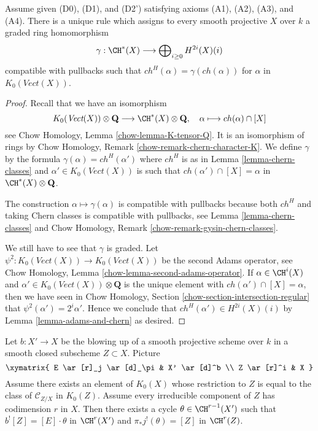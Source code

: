 \begin{lemma}
\label{lemma-cycle-classes}
Assume given (D0), (D1), and (D2') satisfying axioms (A1), (A2), (A3), and (A4).
There is a unique rule which assigns to every smooth projective $X$ over $k$
a graded ring homomorphism
$$
\gamma : \CH^*(X) \longrightarrow \bigoplus\nolimits_{i \geq 0} H^{2i}(X)(i)
$$
compatible with pullbacks such that $ch^H(\alpha) = \gamma(ch(\alpha))$
for $\alpha$ in $K_0(\textit{Vect}(X))$.
\end{lemma}

\begin{proof}
Recall that we have an isomorphism
$$
K_0(\textit{Vect}(X)) \otimes \mathbf{Q}
\longrightarrow \CH^*(X) \otimes \mathbf{Q},\quad
\alpha \longmapsto ch(\alpha) \cap [X]
$$
see Chow Homology, Lemma \ref{chow-lemma-K-tensor-Q}. It is an isomorphism
of rings by Chow Homology, Remark \ref{chow-remark-chern-character-K}.
We define $\gamma$ by the formula $\gamma(\alpha) = ch^H(\alpha')$
where $ch^H$ is as in Lemma \ref{lemma-chern-classes} and
$\alpha' \in K_0(\textit{Vect}(X))$ is such that
$ch(\alpha') \cap [X] = \alpha$ in $\CH^*(X) \otimes \mathbf{Q}$.

\medskip\noindent
The construction $\alpha \mapsto \gamma(\alpha)$ is compatible
with pullbacks because both $ch^H$ and taking Chern classes
is compatible with pullbacks, see
Lemma \ref{lemma-chern-classes} and
Chow Homology, Remark \ref{chow-remark-gysin-chern-classes}.

\medskip\noindent
We still have to see that $\gamma$ is graded.
Let $\psi^2 : K_0(\textit{Vect}(X)) \to K_0(\textit{Vect}(X))$
be the second Adams operator, see Chow Homology,
Lemma \ref{chow-lemma-second-adams-operator}.
If $\alpha \in \CH^i(X)$ and
$\alpha' \in K_0(\textit{Vect}(X)) \otimes \mathbf{Q}$
is the unique element with $ch(\alpha') \cap [X] = \alpha$,
then we have seen in
Chow Homology, Section \ref{chow-section-intersection-regular}
that $\psi^2(\alpha') = 2^i \alpha'$.
Hence we conclude that $ch^H(\alpha') \in H^{2i}(X)(i)$
by Lemma \ref{lemma-adams-and-chern} as desired.
\end{proof}

\begin{lemma}
\label{lemma-divide-pullback-good-blowing-up}
Let $b : X' \to X$ be the blowing up of a smooth projective
scheme over $k$ in a smooth closed subscheme $Z \subset X$.
Picture
$$
\xymatrix{
E \ar[r]_j \ar[d]_\pi & X' \ar[d]^b \\
Z \ar[r]^i & X
}
$$
Assume there exists an element of $K_0(X)$ whose restriction to
$Z$ is equal to the class of $\mathcal{C}_{Z/X}$ in $K_0(Z)$.
Assume every irreducible component of $Z$ has codimension $r$ in $X$.
Then there exists a cycle $\theta \in \CH^{r - 1}(X')$
such that $b^![Z] = [E] \cdot \theta$ in $\CH^r(X')$ and
$\pi_*j^!(\theta) = [Z]$ in $\CH^r(Z)$.
\end{lemma}

